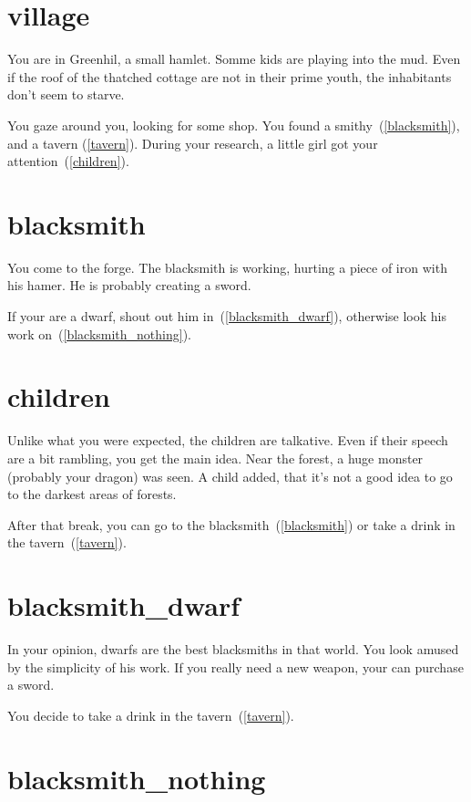 
\section{village}

You are in Greenhil, a small hamlet. Somme kids are playing into the mud. Even
if the roof of the thatched cottage are not in their prime youth, the
inhabitants don't seem to starve.

You gaze around you, looking for some shop. You found a
smithy~(\ref{blacksmith}), and a tavern (\ref{tavern}). During your research, a
little girl got your attention~(\ref{children}).

\section{blacksmith}

You come to the forge. The blacksmith is working, hurting a piece of iron with
his hamer. He is probably creating a sword.

If your are a dwarf, shout out him in~(\ref{blacksmith_dwarf}), otherwise look his
work on~(\ref{blacksmith_nothing}).

\section{children}

Unlike what you were expected, the children are talkative. Even if their speech
are a bit rambling, you get the main idea. Near the forest, a huge monster
(probably your dragon) was seen. A child added, that it's not a good idea to go
to the darkest areas of forests.

After that break, you can go to the blacksmith~(\ref{blacksmith}) or take a drink in
the tavern~(\ref{tavern}).

\section{blacksmith_dwarf}

In your opinion, dwarfs are the best blacksmiths in that world. You look amused
by the simplicity of his work. If you really need a new weapon, your can
purchase a sword.

You decide to take a drink in the tavern~(\ref{tavern}).

\section{blacksmith_nothing}


